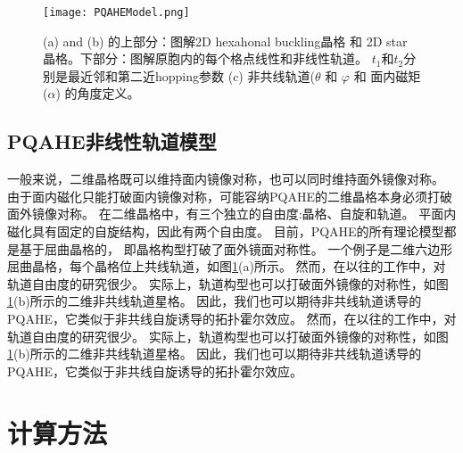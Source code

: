 \begin{figure}[htb]
  \centering
  \texttt{[image: PQAHEModel.png]}
  \caption{(a) and (b) 的上部分：图解2D hexahonal buckling晶格 和 2D star 晶格。下部分：图解原胞内的每个格点线性和非线性轨道。
  $t_1$和$t_2$分别是最近邻和第二近hopping参数 (c) 非共线轨道($\theta$ 和 $\varphi$ 和 面内磁矩 ($\alpha $) 的角度定义。} 
  \label{PQAHEModel}
  \note{}
\end{figure}

\subsection{PQAHE非线性轨道模型}

一般来说，二维晶格既可以维持面内镜像对称，也可以同时维持面外镜像对称。 由于面内磁化只能打破面内镜像对称，可能容纳PQAHE的二维晶格本身必须打破面外镜像对称。 
在二维晶格中，有三个独立的自由度:晶格、自旋和轨道。 平面内磁化具有固定的自旋结构，因此有两个自由度。 目前，PQAHE的所有理论模型都是基于屈曲晶格的，
即晶格构型打破了面外镜面对称性\cite{PQAHE17,PQAHE18,PQAHE19,PQAHE20}。 一个例子是二维六边形屈曲晶格，每个晶格位上共线轨道，如图\ref{PQAHEModel}(a)所示。 
然而，在以往的工作中，对轨道自由度\cite{PQAHE37}的研究很少。 
实际上，轨道构型也可以打破面外镜像的对称性，如图\ref{PQAHEModel}(b)所示的二维非共线轨道星格。 因此，我们也可以期待非共线轨道诱导的PQAHE，它类似于非共线自旋诱导的拓扑霍尔效应。 
然而，在以往的工作中，对轨道自由度的研究很少。 实际上，轨道构型也可以打破面外镜像的对称性，如图\ref{PQAHEModel}(b)所示的二维非共线轨道星格。 
因此，我们也可以期待非共线轨道诱导的PQAHE，它类似于非共线自旋诱导的拓扑霍尔效应\cite{PQAHE38,PQAHE39}。 



\section{计算方法}

